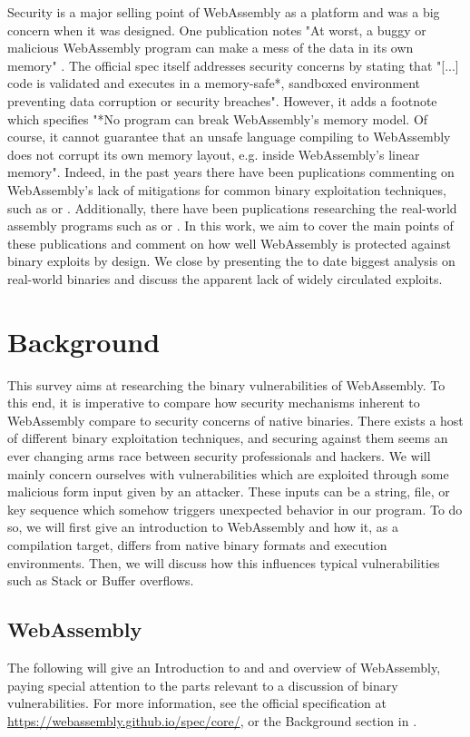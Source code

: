 \documentclass[sigconf]{acmart}
\begin{document}
Security is a major selling point of WebAssembly as a platform and was a big concern when it was designed. One publication notes "At worst, a buggy or malicious WebAssembly program can make a mess of the data in its own memory" \cite{rossberg_bringing_2018}. The official spec itself addresses security concerns by stating that "[...] code is validated and executes in a memory-safe*, sandboxed environment preventing data corruption or security breaches". However, it adds a footnote which specifies "*No program can break WebAssembly’s memory model. Of course, it cannot guarantee that an unsafe language compiling to WebAssembly does not corrupt its own memory layout, e.g. inside WebAssembly’s linear memory". Indeed, in the past years there have been puplications commenting on WebAssembly's lack of mitigations for common binary exploitation techniques, such as \cite{mcfadden_security_2018} or \cite{lehmann_everything_2020}. Additionally, there have been puplications researching the real-world assembly programs such as \cite{musch_new_2019} or \cite{hilbig_empirical_2021}. In this work, we aim to cover the main points of these publications and comment on how well WebAssembly is protected against binary exploits by design. We close by presenting the to date biggest analysis on real-world binaries and discuss the apparent lack of widely circulated exploits.

\section{Background}
\label{sec:background}
This survey aims at researching the binary vulnerabilities of WebAssembly. To this end, it is imperative to compare how security mechanisms inherent to WebAssembly compare to security concerns of native binaries. There exists a host of different binary exploitation techniques, and securing against them seems an ever changing arms race between security professionals and hackers. We will mainly concern ourselves with vulnerabilities which are exploited through some malicious form input given by an attacker. These inputs can be a string, file, or key sequence which somehow triggers unexpected behavior in our program. To do so, we will first give an introduction to WebAssembly and how it, as a compilation target, differs from native binary formats and execution environments. Then, we will discuss how this influences typical vulnerabilities such as Stack or Buffer overflows. 

\subsection{WebAssembly}
\label{sec:wasm}
The following will give an Introduction to and and overview of WebAssembly, paying special attention to the parts relevant to a discussion of binary vulnerabilities. For more information, see the official specification at \url{https://webassembly.github.io/spec/core/}, or the Background section in \cite{lehmann_everything_2020}. 
\end{document}
